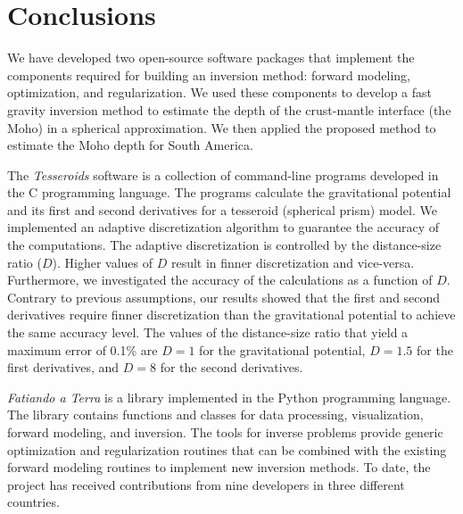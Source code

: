 \chapter{Conclusions}


We have developed two open-source software packages that implement the
components required for building an inversion method: forward modeling,
optimization, and regularization.
We used these components to develop a fast gravity inversion method to estimate
the depth of the crust-mantle interface (the Moho) in a spherical
approximation.
We then applied the proposed method to estimate the Moho depth for South
America.

The \textit{Tesseroids} software is a collection of command-line
programs developed in the C programming language.
The programs calculate the gravitational potential and its first and second
derivatives for a tesseroid (spherical prism) model.
We implemented an adaptive discretization algorithm to guarantee the accuracy
of the computations.
The adaptive discretization is controlled by the distance-size
ratio ($D$).
Higher values of $D$ result in finner discretization and vice-versa.
Furthermore, we investigated the accuracy of the calculations as a function of
$D$.
Contrary to previous assumptions, our results showed that the first and second
derivatives require finner discretization than the gravitational potential to
achieve the same accuracy level.
The values of the distance-size ratio that yield a maximum error of 0.1\%
are $D = 1$ for the gravitational potential, $D = 1.5$ for the first
derivatives, and $D = 8$ for the second derivatives.

\textit{Fatiando a Terra} is a library implemented in the Python programming
language.
The library contains functions and classes for data processing, visualization,
forward modeling, and inversion.
The tools for inverse problems provide generic optimization and regularization
routines that can be combined with the existing forward modeling routines to
implement new inversion methods.
To date, the project has received contributions from nine developers in three
different countries.
